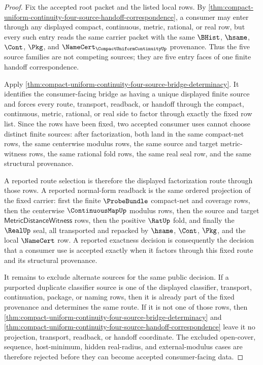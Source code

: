 \begin{proof}
Fix the accepted root packet and the listed local rows. By \autoref{thm:compact-uniform-continuity-four-source-handoff-correspondence}, a consumer may enter through any displayed compact, continuous, metric, rational, or real row, but every such entry reads the same carrier packet with the same $\BHist$, $\hsame$, $\Cont$, $\Pkg$, and $\NameCert_{\CompactUniformContinuityUp}$ provenance. Thus the five source families are not competing sources; they are five entry faces of one finite handoff correspondence.

Apply \autoref{thm:compact-uniform-continuity-four-source-bridge-determinacy}. It identifies the consumer-facing bridge as having a unique displayed finite source and forces every route, transport, readback, or handoff through the compact, continuous, metric, rational, or real side to factor through exactly the fixed row list. Since the rows have been fixed, two accepted consumer uses cannot choose distinct finite sources: after factorization, both land in the same compact-net rows, the same centerwise modulus rows, the same source and target metric-witness rows, the same rational fold rows, the same real seal row, and the same structural provenance.

A reported route selection is therefore the displayed factorization route through those rows. A reported normal-form readback is the same ordered projection of the fixed carrier: first the finite $\ProbeBundle$ compact-net and coverage rows, then the centerwise $\ContinuousMapUp$ modulus rows, then the source and target $\mathsf{MetricDistanceWitness}$ rows, then the positive $\RatUp$ fold, and finally the $\RealUp$ seal, all transported and repacked by $\hsame$, $\Cont$, $\Pkg$, and the local $\NameCert$ row. A reported exactness decision is consequently the decision that a consumer use is accepted exactly when it factors through this fixed route and its structural provenance.

It remains to exclude alternate sources for the same public decision. If a purported duplicate classifier source is one of the displayed classifier, transport, continuation, package, or naming rows, then it is already part of the fixed provenance and determines the same route. If it is not one of those rows, then \autoref{thm:compact-uniform-continuity-four-source-bridge-determinacy} and \autoref{thm:compact-uniform-continuity-four-source-handoff-correspondence} leave it no projection, transport, readback, or handoff coordinate. The excluded open-cover, sequence, host-minimum, hidden real-radius, and external-modulus cases are therefore rejected before they can become accepted consumer-facing data.
\end{proof}
